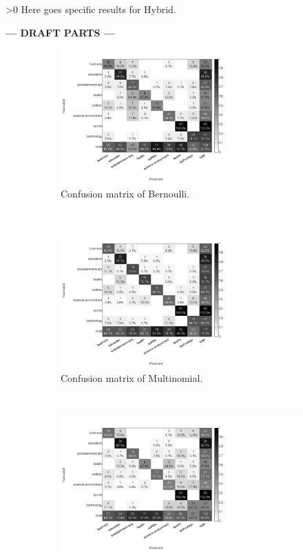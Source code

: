 \ifnum\printdraft>0
	Here goes specific results for Hybrid.
\else
\begin{center}
  	\textbf{--- DRAFT PARTS ---}
\end{center}
\fi

\renewcommand{\figwidth}{0.43\textwidth}
\begin{figure}[H]
	\centering
	\begin{subfigure}[b]{\figwidth}
		\includegraphics[width=\textwidth,trim=0 0 350 0, clip]{img/Bernou_percentile_5_count.png}
		\caption{Confusion matrix of Bernoulli.}
		\label{fig:confmat-be}
	\end{subfigure}
	~
	\begin{subfigure}[b]{\figwidth}
		\includegraphics[width=\textwidth,trim=0 0 350 0, clip]{img/Multinomial_percentile_5_count.png}
		\caption{Confusion matrix of Multinomial.}
		\label{fig:confmat-mn}
	\end{subfigure}
	\\
	\begin{subfigure}[b]{\figwidth}
		\includegraphics[width=\textwidth,trim=0 0 350 0, clip]{img/RandomForest_percentile_5_count.png}

\end{subfigure}
\end{figure}
